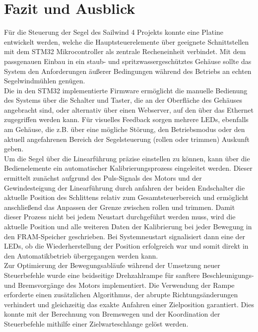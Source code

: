 \newpage
\section{Fazit und Ausblick}
Für die Steuerung der Segel des Sailwind 4 Projekts konnte eine Platine entwickelt werden, welche die Hauptsteuerelemente über geeignete Schnittstellen mit dem STM32 Mikrocontroller als zentrale Recheneinheit verbindet. Mit dem passgenauen Einbau in ein staub- und spritzwassergeschütztes Gehäuse sollte das System den Anforderungen äußerer Bedingungen während des Betriebs an echten Segelwindmühlen genügen.\\

\noindent
Die in den STM32 implementierte Firmware ermöglicht die manuelle Bedienung des Systems über die Schalter und Taster, die an der Oberfläche des Gehäuses angebracht sind, oder alternativ über einen Webserver, auf den über das Ethernet zugegriffen werden kann. Für visuelles Feedback sorgen mehrere LEDs, ebenfalls am Gehäuse, die z.B. über eine mögliche Störung, den Betriebsmodus oder den aktuell angefahrenen Bereich der Segelsteuerung (rollen oder trimmen) Auskunft geben. \\

\noindent
Um die Segel über die Linearführung präzise einstellen zu können, kann über die Bedienelemente ein automatischer Kalibrierungsprozess eingeleitet werden. Dieser ermittelt zunächst aufgrund des Puls-Signals des Motors und der Gewindesteigung der Linearführung durch anfahren der beiden Endschalter die aktuelle Position des Schlittens relativ zum Gesamtsteuerbereich und ermöglicht anschließend das Anpassen der Grenze zwischen rollen und trimmen. Damit dieser Prozess nicht bei jedem Neustart durchgeführt werden muss, wird die aktuelle Position und alle weiteren Daten der Kalibrierung bei jeder Bewegung in den FRAM-Speicher geschrieben. Bei Systemneustart signalisiert dann eine der LEDs, ob die Wiederherstellung der Position erfolgreich war und somit direkt in den Automatikbetrieb übergegangen werden kann. \\

\noindent
Zur Optimierung der Bewegungsabläufe während der Umsetzung neuer Steuerbefehle wurde eine beidseitige Drehzahlrampe für sanftere Beschleunigungs- und Bremsvorgänge des Motors implementiert. Die Verwendung der Rampe erforderte einen zusätzlichen Algorithmus, der abrupte Richtungsänderungen verhindert und gleichzeitig das exakte Anfahren einer Zielposition garantiert. Dies konnte mit der Berechnung von Bremswegen und der Koordination der Steuerbefehle mithilfe einer Zielwarteschlange gelöst werden.

